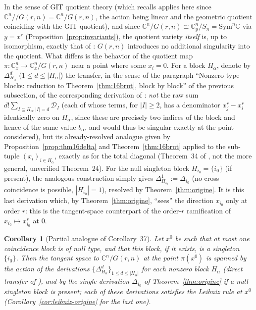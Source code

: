\documentclass[11pt]{article}
\newtheorem{corollary}[theorem]{Corollary}
\theoremstyle{remark}
\newcommand{\CC}{\mathbb{C}}
\begin{document}
In the sense of GIT quotient theory \cite{MFK} (which \cite{Ze} recalls applies here since $\CC^n/\!\!/G(r,n)=\CC^n/G(r,n)$, the action being linear and the geometric quotient coinciding with the GIT quotient), and since $\CC^n/G(r,n)\cong\CC^n_y/S_n=\mathrm{Sym}^n\CC$ via $y=x^r$ (Proposition~\ref{prop:invariants}), the quotient variety \emph{itself} is, up to isomorphism, exactly that of \cite{Ze}: $G(r,n)$ introduces no additional singularity into the quotient. What differs is the behavior of the quotient map $\pi:\CC^n_x\to\CC^n_x/G(r,n)$ near a point where some $x_i=0$. For a block $H_\alpha$, denote by $\Delta_{H_\alpha}^d$ ($1\le d\le|H_\alpha|$) the transfer, in the sense of the paragraph ``Nonzero-type blocks: reduction to Theorem~\ref{thm:16brut}, block by block'' of the previous subsection, of the corresponding derivation of \cite[Corollary~37]{Ze}: \emph{not} the raw sum $d!\sum_{I\subseteq H_\alpha,|I|=d}\mathcal D_I$ (each of whose terms, for $|I|\ge2$, has a denominator $x_j^r-x_i^r$ identically zero on $H_\alpha$, since these are precisely two indices of the block and hence of the same value $b_\alpha$, and would thus be singular exactly at the point considered), but its already-resolved analogue given by Proposition~\ref{prop:thm16delta} and Theorem~\ref{thm:16brut} applied to the sub-tuple $(x_i)_{i\in H_\alpha}$, exactly as for the total diagonal (Theorem~34 of \cite{Ze}, not the more general, unverified Theorem~24). For the null singleton block $H_{i_0}=\{i_0\}$ (if present), the analogous construction simply gives $\Delta_{H_{i_0}}^1:=\Delta_{i_0}$ (no cross coincidence is possible, $|H_{i_0}|=1$), resolved by Theorem~\ref{thm:origine}. It is this last derivation which, by Theorem~\ref{thm:origine}, ``sees'' the direction $x_{i_0}$ only at order $r$: this is the tangent-space counterpart of the order-$r$ ramification of $x_{i_0}\mapsto x_{i_0}^r$ at $0$.

\begin{corollary}[Partial analogue of Corollary~37]\label{cor:git-partiel}
Let $x^0$ be such that at most one coincidence block is of null type, and that this block, if it exists, is a singleton $\{i_0\}$. Then the tangent space to $\CC^n/G(r,n)$ at the point $\pi(x^0)$ is spanned by the action of the derivations $\{\Delta_{H_\alpha}^d\}_{1\le d\le|H_\alpha|}$ for each nonzero block $H_\alpha$ (direct transfer of \cite[Corollary~37]{Ze}), and by the single derivation $\Delta_{i_0}$ of Theorem~\ref{thm:origine} if a null singleton block is present; each of these derivations satisfies the Leibniz rule at $x^0$ (Corollary~\ref{cor:leibniz-origine} for the last one).
\end{corollary}
\end{document}
